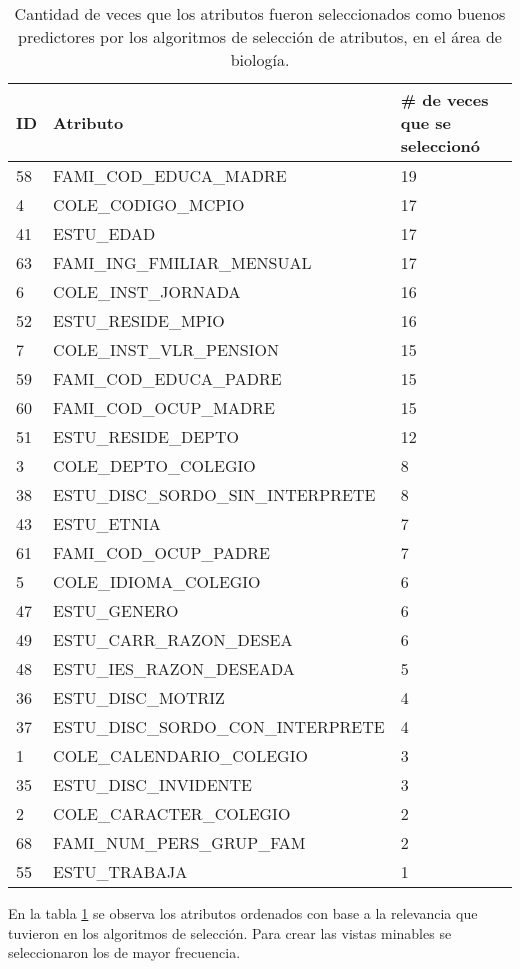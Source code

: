 \begin{table}[!Hhtb]
\centering
\begin{tabular}{|p{1cm}|p{8cm}|p{3cm}|}
\hline
	\rowcolor[gray]{0.9}
	\textbf{ID} &
	\textbf{Atributo} &
	\textbf{\# de veces que se seleccionó}\\
\hline
58    & FAMI_COD_EDUCA_MADRE & 19 \\
\hline
4     & COLE_CODIGO_MCPIO & 17 \\
\hline
41    & ESTU_EDAD & 17 \\
\hline
63    & FAMI_ING_FMILIAR_MENSUAL & 17 \\
\hline
6     & COLE_INST_JORNADA & 16 \\
\hline
52    & ESTU_RESIDE_MPIO & 16 \\
\hline
7     & COLE_INST_VLR_PENSION & 15 \\
\hline
59    & FAMI_COD_EDUCA_PADRE & 15 \\
\hline
60    & FAMI_COD_OCUP_MADRE & 15 \\
\hline
51    & ESTU_RESIDE_DEPTO & 12 \\
\hline
3     & COLE_DEPTO_COLEGIO & 8 \\
\hline
38    & ESTU_DISC_SORDO_SIN_INTERPRETE & 8 \\
\hline
43    & ESTU_ETNIA & 7 \\
\hline
61    & FAMI_COD_OCUP_PADRE & 7 \\
\hline
5     & COLE_IDIOMA_COLEGIO & 6 \\
\hline
47    & ESTU_GENERO & 6 \\
\hline
49    & ESTU_CARR_RAZON_DESEA & 6 \\
\hline
48    & ESTU_IES_RAZON_DESEADA & 5 \\
\hline
36    & ESTU_DISC_MOTRIZ & 4 \\
\hline
37    & ESTU_DISC_SORDO_CON_INTERPRETE & 4 \\
\hline
1     & COLE_CALENDARIO_COLEGIO & 3 \\
\hline
35    & ESTU_DISC_INVIDENTE & 3 \\
\hline
2     & COLE_CARACTER_COLEGIO & 2 \\
\hline
68    & FAMI_NUM_PERS_GRUP_FAM & 2 \\
\hline
55    & ESTU_TRABAJA & 1 \\
\hline
\end{tabular}
\caption{Cantidad de veces que los atributos fueron seleccionados como buenos predictores por los algoritmos de selección de atributos, en el área de biología.}
\label{tab:cuadro31}
\end{table}
En la tabla \ref{tab:cuadro31} se observa los atributos ordenados con base a la relevancia que tuvieron en los algoritmos de selección. Para crear las vistas minables se seleccionaron los de mayor frecuencia.

